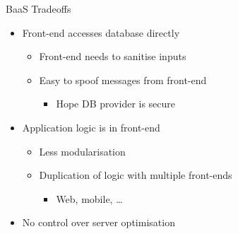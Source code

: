 \documentclass{slide}
\begin{document}
\begin{frame}{BaaS Tradeoffs}
\vspace{1pt}
{\huge
\begin{itemize}
    \item<1-> Front-end accesses database directly
    \vspace{-4pt}
    \begin{itemize}
        \LARGE\item Front-end needs to sanitise inputs
        \vspace{5pt}
        \LARGE\item Easy to spoof messages from front-end
        \begin{itemize}
            \Large\item Hope DB provider is secure
        \end{itemize}
    \end{itemize}
    \vspace{1mm}
    \item<2-> Application logic is in front-end
    \vspace{-4pt}
    \begin{itemize}
        \LARGE\item Less modularisation
        \vspace{8pt}
        \LARGE\item Duplication of logic with multiple front-ends
        \begin{itemize}
            \Large\item Web, mobile, \dots
        \end{itemize}
    \end{itemize}
    \item<3-> No control over server optimisation
\end{itemize}
}
\end{frame}
\end{document}
